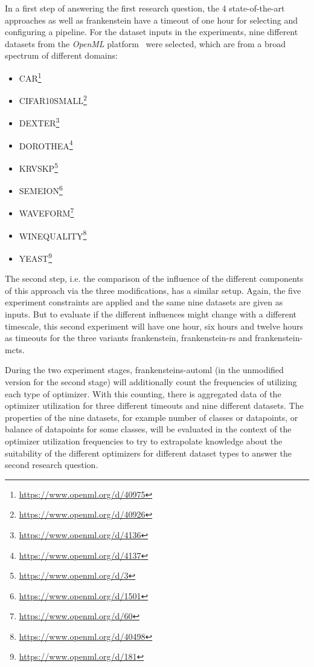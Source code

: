 In a first step of answering the first research question, the 4 state-of-the-art approaches as well as frankenstein have a timeout of one hour for selecting and configuring a pipeline.
For the dataset inputs in the experiments, nine different datasets from the \textit{OpenML} platform~\cite{Vanschoren-OpenML} were selected, which are from a broad spectrum of different domains:
\begin{itemize}
    \item CAR\footnote{\url{https://www.openml.org/d/40975}}
    \item CIFAR10SMALL\footnote{\url{https://www.openml.org/d/40926}}
    \item DEXTER\footnote{\url{https://www.openml.org/d/4136}}
    \item DOROTHEA\footnote{\url{https://www.openml.org/d/4137}}
    \item KRVSKP\footnote{\url{https://www.openml.org/d/3}}
    \item SEMEION\footnote{\url{https://www.openml.org/d/1501}}
    \item WAVEFORM\footnote{\url{https://www.openml.org/d/60}}
    \item WINEQUALITY\footnote{\url{https://www.openml.org/d/40498}}
    \item YEAST\footnote{\url{https://www.openml.org/d/181}}
\end{itemize}

The second step, i.e. the comparison of the influence of the different components of this approach via the three modifications, has a similar setup.
Again, the five experiment constraints are applied and the same nine datasets are given as inputs.
But to evaluate if the different influences might change with a different timescale, this second experiment will have one hour, six hours and twelve hours as timeouts for the three variants frankenstein, frankenstein-rs and frankenstein-mcts.

During the two experiment stages, frankensteins-automl (in the unmodified version for the second stage) will additionally count the frequencies of utilizing each type of optimizer.
With this counting, there is aggregated data of the optimizer utilization for three different timeouts and nine different datasets.
The properties of the nine datasets, for example number of classes or datapoints, or balance of datapoints for some classes, will be evaluated in the context of the optimizer utilization frequencies to try to extrapolate knowledge about the suitability of the different optimizers for different dataset types to answer the second research question.

